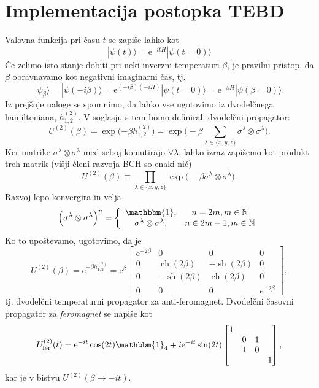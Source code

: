 \documentclass[12pt, a4 paper]{article}
\newcommand{\e}{
	\ensuremath{\mathrm{e}}
}
\newcommand{\ch}{
	\operatorname{ch}
}
\newcommand{\sh}{
	\operatorname{sh}
}
\begin{document}
\section{Implementacija postopka TEBD}

Valovna funkcija pri \v casu $t$ se zapi\v se lahko kot
\[
	|\psi(t)\rangle = \e^{-itH} |\psi(t = 0)\rangle
\]
\v Ce zelimo isto stanje dobiti pri neki inverzni temperaturi $\beta$, je pravilni pristop, da $\beta$ obravnavamo
kot negativni imaginarni \v cas, tj.
\[
	|\psi_{\beta}\rangle = |\psi(-i\beta)\rangle = \e^{(-i\beta)(-i H)}|\psi(t = 0)\rangle = \e^{-\beta H}
		|\psi(\beta=0)\rangle.
\]
Iz prej\v snje naloge se spomnimo, da lahko vse ugotovimo iz dvodel\v cnega hamiltoniana, $h^{(2)}_{1,2}$. V soglasju s tem
bomo definirali dvodel\v cni propagator:
\[
	U^{(2)}(\beta) = \exp\Big({-\beta h^{(2)}_{1,2}}\Big) = \exp\bigg(-\beta\sum_{\lambda \in \{x,y,z\}}\sigma^\lambda
		\otimes \sigma^\lambda\bigg).
\]
Ker matrike $\sigma^\lambda \otimes \sigma^\lambda$ med seboj komutirajo $\forall \lambda$, lahko izraz zapi\v semo kot
produkt treh matrik (vi\v sji \v cleni razvoja BCH so enaki ni\v c)
\begin{equation}
	U^{(2)}(\beta) \equiv \prod_{\lambda \in \{x,y,z\}} \exp\big(-\beta \sigma^\lambda \otimes \sigma^\lambda\big).
\end{equation}
Razvoj lepo konvergira in velja
\[
	\Big(\sigma^\lambda \otimes \sigma^\lambda\Big)^n = \left\{
		\begin{array}{cc}
			\mathbbm{1}, & n = 2m, m \in \mathbb{N} \\
			\sigma^\lambda \otimes \sigma^\lambda, & n \in 2m - 1, m \in \mathbb{N}
		\end{array}
	\right.
\]
Ko to upo\v stevamo, ugotovimo, da je
\[
	U^{(2)}(\beta) = \e^{-\beta h^{(2)}_{1,2}} = \e^{\beta}\begin{bmatrix}
		\e^{-2\beta} & 0 & 0 & 0\\
		0 & \ch(2\beta) & -\sh(2\beta) & 0 \\
		0 & -\sh(2\beta) & \ch(2\beta) & 0 \\
		0 & 0 & 0 & e^{-2\beta}
	\end{bmatrix},
\]
tj. dvodel\v cni temperaturni propagator za anti-feromagnet. Dvodel\v cni \v casovni propagator za \emph{feromagnet} se
napi\v se kot
\[
	U^{(2)}_\text{fer}(t) = \e^{-it}\cos(2t)\mathbbm{1}_4 + i\e^{-it}\sin(2t) \begin{bmatrix}
		1 &  &  &  \\
		 & 0 & 1 &  \\
		 & 1 & 0 &  \\
		 &  &  & 1 \end{bmatrix},
\]
kar je v bistvu $U^{(2)}(\beta \to -it)$.
\end{document}
